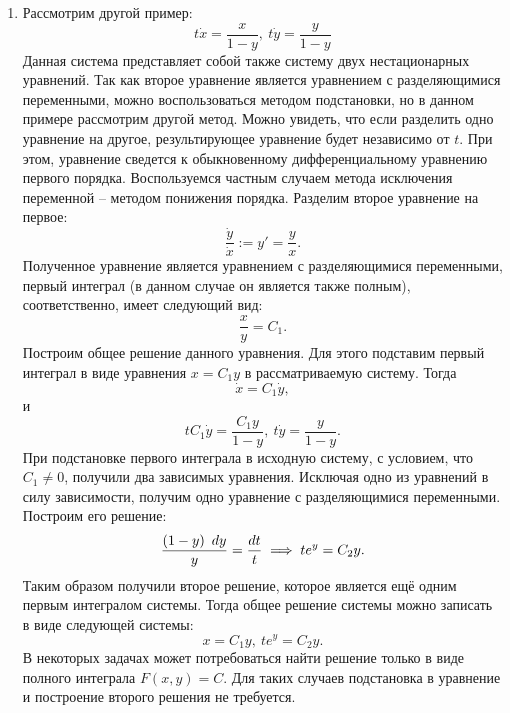\begin{enumerate}
			\item Рассмотрим другой пример:
				\[ t\dot{x} = \frac{x}{1 - y}, ~ t\dot{y} = \frac{y}{1 - y} \]
				Данная система представляет собой также систему двух нестационарных уравнений. Так как второе уравнение является уравнением с разделяющимися переменными, можно воспользоваться методом подстановки, но в данном примере рассмотрим другой метод. Можно увидеть, что если разделить одно уравнение на другое, результирующее уравнение будет независимо от $t$. При этом, уравнение сведется к обыкновенному дифференциальному уравнению первого порядка. Воспользуемся частным случаем метода исключения переменной -- методом понижения порядка. Разделим второе уравнение на первое:
				\[ \frac{\dot{y}}{\dot{x}} := y' = \frac{y}{x}. \]
				Полученное уравнение является уравнением с разделяющимися переменными, первый интеграл (в данном случае он является также полным), соответственно, имеет следующий вид:
				\[ \frac{x}{y} = C_1. \]
				Построим общее решение данного уравнения. Для этого подставим первый интеграл в виде уравнения $x = C_1 y$ в рассматриваемую систему. Тогда
				\[ \dot{x} = C_1 \dot{y}, \]
				и
				\[ t C_1 \dot{y} = \frac{C_1 y}{1 - y}, ~ t \dot{y} = \frac{y}{1 - y}. \]
				При подстановке первого интеграла в исходную систему, с условием, что $C_1 \neq 0$, получили два зависимых уравнения. Исключая одно из уравнений в силу зависимости, получим одно уравнение с разделяющимися переменными. Построим его решение:
				\[ \frac{\left( 1 - y \right) ~ dy}{y} = \frac{dt}{t} \implies t e^{y} = C_2 y. \]
				Таким образом получили второе решение, которое является ещё одним первым интегралом системы. Тогда общее решение системы можно записать в виде следующей системы:
				\[ x = C_1 y, ~ t e^{y} = C_2 y. \]
				В некоторых задачах может потребоваться найти решение только в виде полного интеграла $F(x, y) = C$. Для таких случаев подстановка в уравнение и построение второго решения не требуется.


\end{enumerate}
